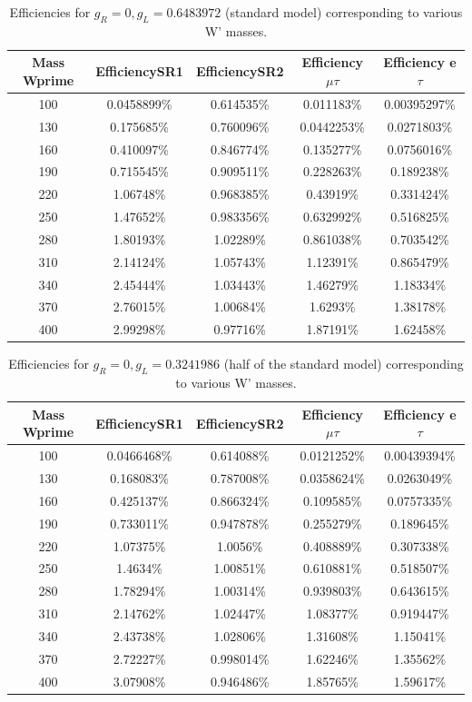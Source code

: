   \begin{table}[htb]
 	\centering
  	\begin{tabular}{|ccccc|}
  		\hline 
  		Mass Wprime & EfficiencySR1 & EfficiencySR2 & Efficiency $\mu$$\tau$ & Efficiency e $\tau$ \\
\hline 
  		100& 0.0458899\%& 0.614535\%& 0.011183\% & 0.00395297\%\\
 		130& 0.175685\%& 0.760096\%& 0.0442253\%& 0.0271803\%\\
  		160& 0.410097\%& 0.846774\%& 0.135277\%& 0.0756016\%\\
  		190& 0.715545\%& 0.909511\%& 0.228263\%& 0.189238\%\\
  		220& 1.06748\%& 0.968385\%& 0.43919\%& 0.331424\%\\
  		250& 1.47652\%& 0.983356\%& 0.632992\%& 0.516825\%\\ 
  		280& 1.80193\%& 1.02289\%& 0.861038\%& 0.703542\%\\
 		310& 2.14124\%& 1.05743\%& 1.12391\%& 0.865479\%\\
  		340& 2.45444\%& 1.03443\%& 1.46279\%& 1.18334\%\\ 
  		370& 2.76015\%& 1.00684\%& 1.6293\%& 1.38178\%\\
  		400& 2.99298\%& 0.97716\%& 1.87191\%& 1.62458\%\\

  		\hline
  	\end{tabular}
  	\caption{Efficiencies for $ g_R=0 , g_L=0.6483972 $ (standard model) corresponding to various W' masses. \label{eff-SM} }
  \end{table}


   \begin{table}[htb]
 	\centering
  	\begin{tabular}{|ccccc|}
  		\hline 
  		Mass Wprime  & EfficiencySR1  & EfficiencySR2 & Efficiency $\mu$$\tau$ & Efficiency e $\tau$ \\
                \hline 
100& 0.0466468\%& 0.614088\%& 0.0121252\%& 0.00439394\%\\
130& 0.168083\%& 0.787008\%& 0.0358624\%& 0.0263049\%\\
160& 0.425137\%& 0.866324\%& 0.109585\%& 0.0757335\%\\
190& 0.733011\%& 0.947878\%& 0.255279\%& 0.189645\%\\
220& 1.07375\%& 1.0056\%& 0.408889\%& 0.307338\%\\
250& 1.4634\%& 1.00851\%& 0.610881\%& 0.518507\%\\
280& 1.78294\%& 1.00314\%& 0.939803\%& 0.643615\%\\
310& 2.14762\%& 1.02447\%& 1.08377\%& 0.919447\%\\
340& 2.43738\%& 1.02806\%& 1.31608\%& 1.15041\%\\
370& 2.72227\%& 0.998014\%& 1.62246\%& 1.35562\%\\
400& 3.07908\%& 0.946486\%& 1.85765\%& 1.59617\%\\
  	
  	\hline
  	\end{tabular}
  	\caption{Efficiencies for $ g_R=0 , g_L=0.3241986 $ (half of the standard model) corresponding to various W' masses. \label{eff-half} }
  \end{table}
 

